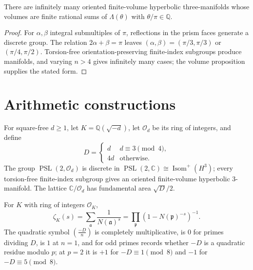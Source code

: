 \begin{theorem}
\label{thurston-ch07-reflection-quotient-infinite-family}

There are infinitely many oriented finite-volume hyperbolic three-manifolds whose volumes are finite rational sums of $\Lambda(\theta)$ with $\theta/\pi\in\mathbb Q$.
\end{theorem}
\begin{proof}
\sketch
For $\alpha,\beta$ integral submultiples of $\pi$, reflections in the prism faces generate a discrete group.  The relation $2\alpha+\beta=\pi$ leaves $(\alpha,\beta)=(\pi/3,\pi/3)$ or $(\pi/4,\pi/2)$.  Torsion-free orientation-preserving finite-index subgroups produce manifolds, and varying $n>4$ gives infinitely many cases; the volume proposition supplies the stated form.
\end{proof}

\section{Arithmetic constructions}

\begin{definition}
\label{thurston-ch07-bianchi-group-discriminant}

For square-free $d\geq1$, let $K=\mathbb Q(\sqrt{-d})$, let $\mathcal O_d$ be its ring of integers, and define
\[
D=\begin{cases}d&d\equiv3\pmod4,\\4d&\text{otherwise.}\end{cases}
\]
The group $\operatorname{PSL}(2,\mathcal O_d)$ is discrete in $\operatorname{PSL}(2,\mathbb C)\cong\operatorname{Isom}^+(H^3)$; every torsion-free finite-index subgroup gives an oriented finite-volume hyperbolic $3$-manifold.  The lattice $\mathbb C/\mathcal O_d$ has fundamental area $\sqrt D/2$.
\end{definition}

\begin{definition}
\label{thurston-ch07-dedekind-zeta-quadratic-symbol}

For $K$ with ring of integers $\mathcal O_K$,
\[
\zeta_K(s)=\sum_{\mathfrak a}\frac1{N(\mathfrak a)^s}=\prod_{\mathfrak p}(1-N(\mathfrak p)^{-s})^{-1}.
\]
The quadratic symbol $\left(\frac{-D}{n}\right)$ is completely multiplicative, is $0$ for primes dividing $D$, is $1$ at $n=1$, and for odd primes records whether $-D$ is a quadratic residue modulo $p$; at $p=2$ it is $+1$ for $-D\equiv1\pmod8$ and $-1$ for $-D\equiv5\pmod8$.
\end{definition}

